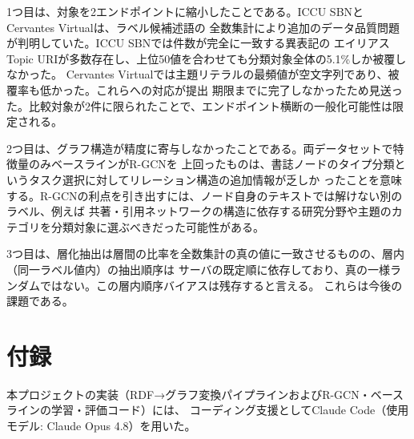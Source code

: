 \documentclass[dvipdfmx,twoside,11pt]{article}
\begin{document}
1つ目は、対象を2エンドポイントに縮小したことである。ICCU SBNとCervantes Virtualは、ラベル候補述語の
全数集計により追加のデータ品質問題が判明していた。ICCU SBNでは件数が完全に一致する異表記の
エイリアスTopic URIが多数存在し、上位50値を合わせても分類対象全体の5.1\%しか被覆しなかった。
Cervantes Virtualでは主題リテラルの最頻値が空文字列であり、被覆率も低かった。これらへの対応が提出
期限までに完了しなかったため見送った。比較対象が2件に限られたことで、エンドポイント横断の一般化可能性は限定される。

2つ目は、グラフ構造が精度に寄与しなかったことである。両データセットで特徴量のみベースラインがR-GCNを
上回ったものは、書誌ノードのタイプ分類というタスク選択に対してリレーション構造の追加情報が乏しか
ったことを意味する。R-GCNの利点を引き出すには、ノード自身のテキストでは解けない別のラベル、例えば
共著・引用ネットワークの構造に依存する研究分野や主題のカテゴリを分類対象に選ぶべきだった可能性がある。

3つ目は、層化抽出は層間の比率を全数集計の真の値に一致させるものの、層内（同一ラベル値内）の抽出順序は
サーバの既定順に依存しており、真の一様ランダムではない。この層内順序バイアスは残存すると言える。
これらは今後の課題である。

\section*{付録}

本プロジェクトの実装（RDF→グラフ変換パイプラインおよびR-GCN・ベースラインの学習・評価コード）には、
コーディング支援としてClaude Code（使用モデル: Claude Opus 4.8）を用いた。

\vskip 0.2in

\end{document}
